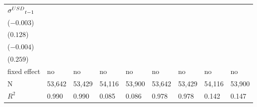 \begin{tabular}{lllllllll}
${{\it \sigma}^{USD}}_{t-1}$ &                            \makecell{} &  \makecell{$-0.000^{*}$ \\ ($-0.003$)} &                            \makecell{} &  \makecell{$0.021^{***}$ \\ ($0.128$)} &                            \makecell{} &   \makecell{$-0.001^{}$ \\ ($-0.004$)} &                            \makecell{} &  \makecell{$0.077^{***}$ \\ ($0.259$)} \\
\midrule fixed effect        &                                     no &                                     no &                                     no &                                     no &                                     no &                                     no &                                     no &                                     no \\
N                            &                                 53,642 &                                 53,429 &                                 54,116 &                                 53,900 &                                 53,642 &                                 53,429 &                                 54,116 &                                 53,900 \\
$R^2$                        &                                  0.990 &                                  0.990 &                                  0.085 &                                  0.086 &                                  0.978 &                                  0.978 &                                  0.142 &                                  0.147 \\
\bottomrule
\end{tabular}
